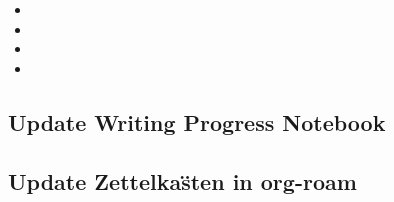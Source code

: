 \documentclass[10pt,letterpaper]{article}
\newcommand{\bi}{\begin{itemize}}
\newcommand{\ei}{\end{itemize}}
\begin{document}

\bi
\item 
\item 
\item 
\item 
\ei




\subsection{Update Writing Progress Notebook}
\label{sub:WPsheet}







\subsection{Update Zettelka\"sten in org-roam}
\label{sub:zk}

\end{document}
